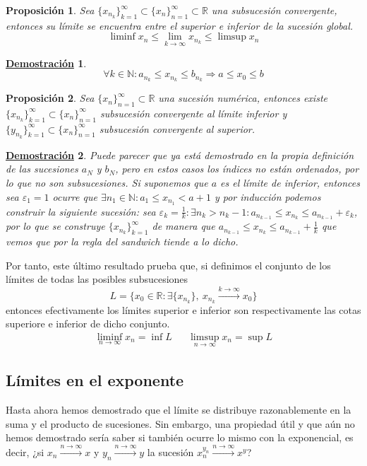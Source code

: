 \documentclass[10pt,a4paper,openright]{book}
\theoremstyle{break}
\newtheorem{prop}{Proposición}[chapter]
\newtheorem*{demo}{\underline{Demostración}}
\begin{document}
\begin{prop}
Sea $\{x_{n_k}\}_{k=1}^\infty\subset \{x_n\}_{n=1}^\infty\subset \mathbb{R}$ una subsucesión convergente, entonces su límite se encuentra entre el superior e inferior de la sucesión global.
\[
\liminf x_n \leq \lim_{k\rightarrow \infty} x_{n_k} \leq \limsup x_n
\]
\end{prop}
\begin{demo}
$$\forall k\in \mathbb N: a_{n_k}\leq x_{n_k} \leq b_{n_k} \Rightarrow a\leq x_0 \leq b$$
\end{demo}

\begin{prop}
Sea $\{x_n\}_{n=1}^\infty \subset \mathbb{R}$ una sucesión numérica, entonces existe $\{x_{n_k}\}_{k=1}^\infty\subset \{x_n\}_{n=1}^\infty$ subsucesión convergente al límite inferior y $\{y_{n_k}\}_{k=1}^\infty\subset \{x_n\}_{n=1}^\infty$ subsucesión convergente al superior.
\end{prop}
\begin{demo}
Puede parecer que ya está demostrado en la propia definición de las sucesiones $a_N$ y $b_N$, pero en estos casos los índices no están ordenados, por lo que no son subsucesiones.
Si suponemos que $a$ es el límite de inferior, entonces sea $\varepsilon_1=1$ ocurre que $\exists n_1\in \mathbb N: a_1\leq x_{n_1}<a+1$ y por inducción podemos construir la siguiente sucesión: sea $\varepsilon_k= \frac{1}{k} : \exists n_k > n_k -1: a_{n_{k-1}}\leq x_{n_k}\leq a_{n_{k-1}}+\varepsilon_k$, por lo que se construye $\{x_{n_k}\}_{k=1}^\infty$ de manera que $a_{n_{k-1}}\leq x_{n_k}\leq a_{n_{k-1}}+\frac{1}{k}$ que vemos que por la regla del sandwich tiende a lo dicho.
\end{demo}

Por tanto, este último resultado prueba que, si definimos el conjunto de los límites de todas las posibles subsucesiones
\[
L=\{x_0\in \mathbb R: \exists \{x_{n_k}\}, \ x_{n_k}\xrightarrow{k\rightarrow \infty} x_0\}
\]
entonces efectivamente los límites superior e inferior son respectivamente las cotas superiore e inferior de dicho conjunto.
\begin{align*}
\liminf_{n\rightarrow\infty}x_n=\inf L && \limsup_{n\rightarrow\infty}x_n=\sup L
\end{align*}

\subsection{Límites en el exponente}
Hasta ahora hemos demostrado que el límite se distribuye razonablemente en la suma y el producto de sucesiones. Sin embargo, una propiedad útil y que aún no hemos demostrado sería saber si también ocurre lo mismo con la exponencial, es decir, ¿si $x_n \xrightarrow{n\rightarrow \infty} x$ y $y_n \xrightarrow{n\rightarrow \infty} y$ la sucesión $x_n^{y_n} \xrightarrow{n\rightarrow \infty} x^y$?
\end{document}
